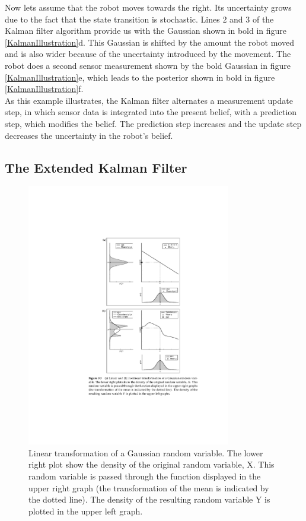 \documentclass[conference]{IEEEtran}
\begin{document}
Now lets assume that the robot moves towards the right. Its uncertainty grows due to the fact that the state transition is stochastic. Lines 2 and 3 of the Kalman filter algorithm provide us with the Gaussian shown in bold in figure \ref{KalmanIllustration}d. This Gaussian is shifted by the amount the robot moved and is also wider because of the uncertainty introduced by the movement. The robot does a second sensor measurement shown by the bold Gaussian in figure \ref{KalmanIllustration}e, which leads to the posterior shown in bold in figure \ref{KalmanIllustration}f.\\

As this example illustrates, the Kalman filter alternates a measurement update step, in which sensor data is integrated into the present belief, with a prediction step, which modifies the belief. The prediction step increases and the update step decreases the uncertainty in the robot's belief.

\subsection{The Extended Kalman Filter}

\begin{figure}[!t]
\centering
\includegraphics[width=3.5in]{./figures/KalmanXform.pdf}
\caption{Linear transformation of a Gaussian random variable. The lower right plot show the density of the original random variable, X. This random variable is passed through the function displayed in the upper right graph (the transformation of the mean is indicated by the dotted line). The density of the resulting random variable Y is plotted in the upper left graph.}
\label{KalmanXform}
\end{figure}
\end{document}
